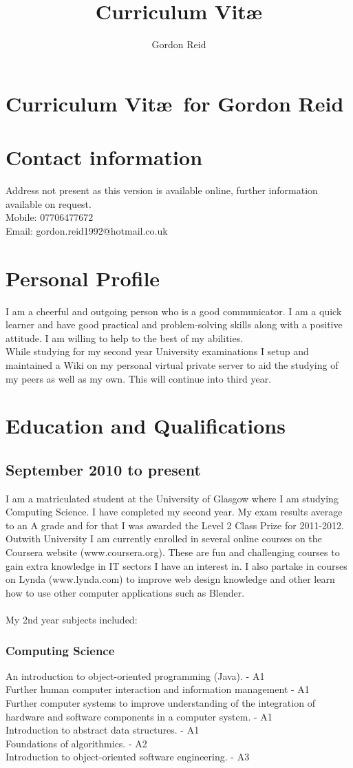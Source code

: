 \documentclass[10pt,a4paper]{article}
\title{Curriculum Vit\ae}
\author{Gordon Reid}
\begin{document}
\section*{Curriculum Vit\ae\ for Gordon Reid}
\section*{Contact information}
Address not present as this version is available online, further information available on request.\\
Mobile: 07706477672\\
Email: gordon.reid1992@hotmail.co.uk
\section*{Personal Profile}
I am a cheerful and outgoing person who is a good communicator. I am a quick learner and have good practical and problem-solving skills along with a positive attitude. I am willing to help to the best of my abilities.\\
While studying for my second year University examinations I setup and maintained a Wiki on my personal virtual private server to aid the studying of my peers as well as my own. This will continue into third year.
\section*{Education and Qualifications}
\subsection*{September 2010 to present}
I am a matriculated student at the University of Glasgow where I am studying Computing Science. I have completed my second year. My exam results average to an A grade and for that I was awarded the Level 2 Class Prize for 2011-2012.\\
Outwith University I am currently enrolled in several online courses on the Coursera website (www.coursera.org). These are fun and challenging courses to gain extra knowledge in IT sectors I have an interest in. I also partake in courses on Lynda (www.lynda.com) to improve web design knowledge and other learn how to use other computer applications such as Blender.\\\\
My 2nd year subjects included:
\subsubsection*{Computing Science}
An introduction to object-oriented programming (Java). - A1\\
Further human computer interaction and information management - A1\\
Further computer systems to improve understanding of the integration of hardware and software components in a computer system. - A1\\
Introduction to abstract data structures. - A1\\
Foundations of algorithmics. - A2\\
Introduction to object-oriented software engineering. - A3
\end{document}
